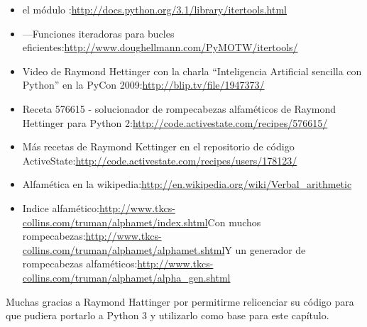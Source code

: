 \begin{itemize}

\item el módulo :\newline\href{http://docs.python.org/3.1/library/itertools.html}{http://docs.python.org/3.1/library/itertools.html}

\item {}---Funciones iteradoras para bucles eficientes:\newline\href{http://www.doughellmann.com/PyMOTW/itertools/}{http://www.doughellmann.com/PyMOTW/itertools/}

\item Video de Raymond Hettinger con la charla ``Inteligencia Artificial sencilla con Python'' en la PyCon 2009:\newline\href{http://blip.tv/file/1947373/}{http://blip.tv/file/1947373/}

\item Receta 576615 - solucionador de rompecabezas alfaméticos de Raymond Hettinger para Python 2:\newline\href{http://code.activestate.com/recipes/576615/}{http://code.activestate.com/recipes/576615/}

\item Más recetas de Raymond Kettinger en el repositorio de código ActiveState:\newline\href{http://code.activestate.com/recipes/users/178123/}{http://code.activestate.com/recipes/users/178123/}

\item Alfamética en la wikipedia:\newline\href{http://en.wikipedia.org/wiki/Verbal\_arithmetic}{http://en.wikipedia.org/wiki/Verbal\_arithmetic}

\item Indice alfamético:\newline\href{http://www.tkcs-collins.com/truman/alphamet/index.shtml}{http://www.tkcs-collins.com/truman/alphamet/index.shtml}\newline Con muchos rompecabezas:\newline\href{http://www.tkcs-collins.com/truman/alphamet/alphamet.shtml}{http://www.tkcs-collins.com/truman/alphamet/alphamet.shtml}\newline Y un generador de rompecabezas alfaméticos:\newline\href{http://www.tkcs-collins.com/truman/alphamet/alpha\_gen.shtml}{http://www.tkcs-collins.com/truman/alphamet/alpha\_gen.shtml}

\end{itemize}

Muchas gracias a Raymond Hattinger por permitirme relicenciar su código para que pudiera portarlo a Python 3 y utilizarlo como base para este capítulo.
